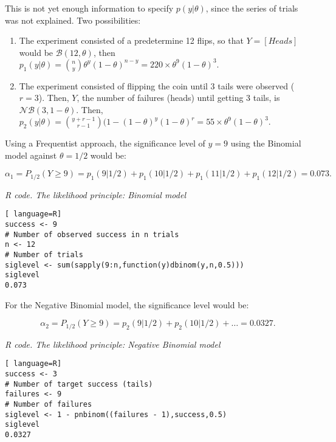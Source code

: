 This is not yet enough information to specify $p(y|\theta)$, since the series of trials was not explained. Two possibilities:

\begin{enumerate}
	\item The experiment consisted of a predetermine 12 flips, so that $Y=\left[Heads\right]$ would be $\mathcal{B}(12,\theta)$, then $p_1(y|\theta)={\binom{{n}}{{y}}}\theta^y(1-\theta)^{n-y}=220\times\theta^9(1-\theta)^{3}.$
	\item The experiment consisted of flipping the coin until 3 tails were observed ($r=3$). Then, $Y$, the number of failures (heads) until getting 3 tails, is $\mathcal{N}\mathcal{B}(3,1-\theta)$. Then, $p_2(y|\theta)={\binom{{y+r-1}}{{r-1}}}(1-(1-\theta)^y(1-\theta)^{r}=55\times\theta^9(1-\theta)^{3}.$  
\end{enumerate}

Using a Frequentist approach, the significance level of $y=9$ using the Binomial model against $\theta=1/2$ would be:

\begin{equation*}
	\alpha_1=P_{1/2}(Y\geq
	9)=p_1(9|1/2)+p_1(10|1/2)+p_1(11|1/2)+p_1(12|1/2)=0.073.
\end{equation*}

\begin{tcolorbox}[enhanced,width=4.67in,center upper,
	fontupper=\large\bfseries,drop shadow southwest,sharp corners]
	\textit{R code. The likelihood principle: Binomial model}
\begin{VF}
\begin{lstlisting}[ language=R]
success <- 9 
# Number of observed success in n trials
n <- 12 
# Number of trials
siglevel <- sum(sapply(9:n,function(y)dbinom(y,n,0.5)))
siglevel
0.073
\end{lstlisting}
\end{VF}
\end{tcolorbox}

For the Negative Binomial model, the significance level would be:

\begin{equation*}
	\alpha_2=P_{1/2}(Y\geq 9)=p_2(9|1/2)+p_2(10|1/2)+\ldots=0.0327.
\end{equation*}

\begin{tcolorbox}[enhanced,width=4.67in,center upper,
	fontupper=\large\bfseries,drop shadow southwest,sharp corners]
	\textit{R code. The likelihood principle: Negative Binomial model}
\begin{VF}
\begin{lstlisting}[ language=R]
success <- 3 
# Number of target success (tails)
failures <- 9 
# Number of failures
siglevel <- 1 - pnbinom((failures - 1),success,0.5)
siglevel
0.0327
\end{lstlisting}
\end{VF}
\end{tcolorbox}

